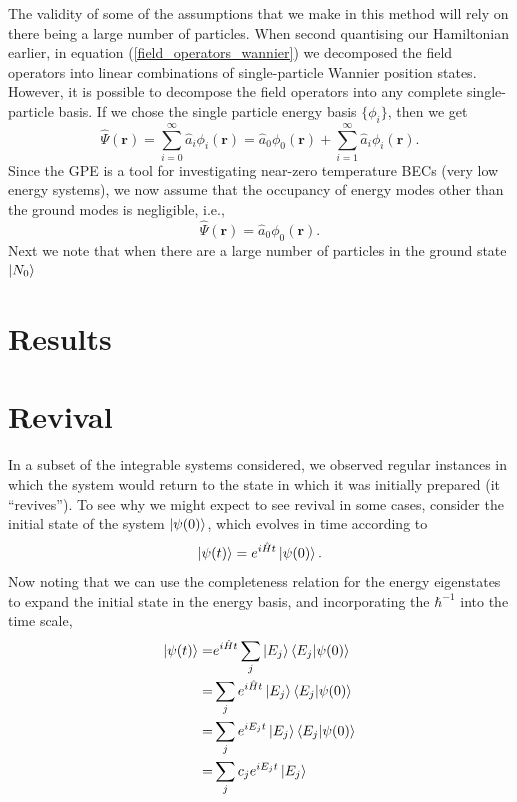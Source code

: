 \documentclass[a4paper,10pt]{article}
\theoremstyle{plain}
\begin{document}
The validity of some of the assumptions that we make in this 
method will rely on there being a large number of particles. When second 
quantising our Hamiltonian earlier, in equation (\ref{field_operators_wannier}) 
we decomposed the field operators into linear combinations of single-particle 
Wannier position states. However, it is possible to decompose the field 
operators into any complete single-particle basis. If we chose the single 
particle energy basis $\{\phi_i\}$, then we get
\begin{equation}
 \hat{\Psi}(\mathbf{r})
 =
 \sum_{i=0}^\infty \hat{a}_i\phi_{i}(\mathbf{r}) 
 = 
 \hat{a}_0\phi_{0}(\mathbf{r}) 
 + 
 \sum_{i=1}^\infty \hat{a}_i\phi_{i}(\mathbf{r}).
\end{equation}
Since the GPE is a tool for investigating near-zero temperature BECs (very low 
energy systems), we now assume that the occupancy of energy modes other than 
the ground modes is negligible, i.e.,
\begin{equation}
 \hat{\Psi}(\mathbf{r})=\hat{a}_0\phi_{0}(\mathbf{r}).
\end{equation}
Next we note that when there are a large number of particles in the ground
state $\ket{N_0}$












\section{Results}

\section{Revival \label{revival}}

In a subset of the integrable systems considered, we observed regular instances 
in which the system would return to the state in which it was initially 
prepared (it ``revives''). To see why we might expect to see revival in 
some cases, consider the initial state of the system $\ket{\psi(0)}$, which 
evolves in time according to
\begin{equation}
 \ket{\psi(t)}=e^{i\hat{H}t}\ket{\psi(0)}.
\end{equation}
Now noting that we can use the completeness relation for the energy eigenstates 
to expand the initial state in the energy basis, and incorporating the 
$\hbar^{-1}$ into the time scale,
\begin{align}
 \ket{\psi(t)} =&e^{i\hat{H}t}\sum_j\ket{E_j}\braket{E_j|\psi(0)}  \nonumber \\
               =&\sum_je^{i\hat{H}t}\ket{E_j}\braket{E_j|\psi(0)} \nonumber \\
                =&\sum_je^{iE_{j}t}\ket{E_j}\braket{E_j|\psi(0)}  \nonumber \\
                =&\sum_j c_{j}e^{iE_{j}t}\ket{E_j}
\end{align}
\end{document}
